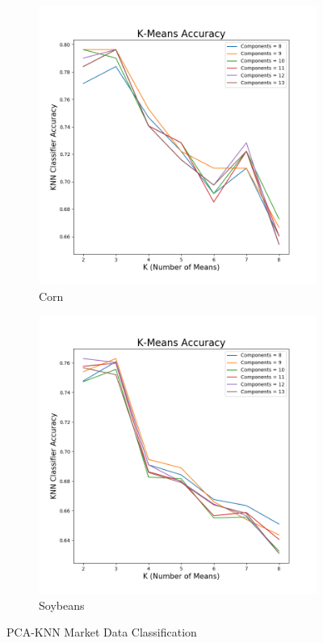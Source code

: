 \documentclass{article}
\begin{document}
\begin{figure}[H]
\centering
\begin{subfigure}{.5\textwidth}
  \centering
  \includegraphics[scale=.38]{images/cornacc8,13,m}
\caption{Corn}
\end{subfigure}%
\begin{subfigure}{.5\textwidth}
  \centering
  \includegraphics[scale=.38]{images/soyacc8,13,m}
\caption{Soybeans}
\end{subfigure}
\caption{PCA-KNN Market Data Classification}
\end{figure}
\end{document}

